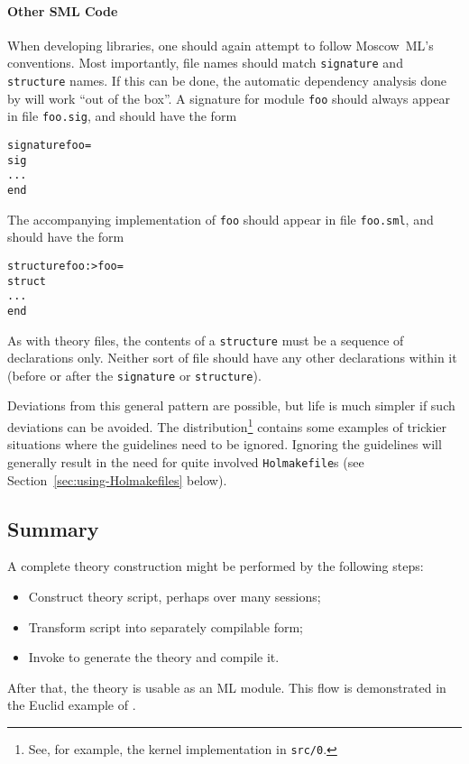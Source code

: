 \paragraph{Other SML Code}
When developing \HOL{} libraries, one should again attempt to follow Moscow~ML's conventions.
Most importantly, file names should match \texttt{signature} and \texttt{structure} names.
If this can be done, the automatic dependency analysis done by \holmake{} will work ``out of the box''.
A signature for module \texttt{foo} should always appear in file \texttt{foo.sig}, and should have the form
\begin{alltt}
    signature foo =
    sig
      ...
    end
\end{alltt}
The accompanying implementation of \texttt{foo} should appear in file \texttt{foo.sml}, and should have the form
\begin{alltt}
    structure foo :> foo =
    struct
    ...
    end
\end{alltt}
As with theory files, the contents of a \texttt{structure} must be a sequence of declarations only.
Neither sort of file should have any other declarations within it (before or after the \texttt{signature} or \texttt{structure}).

Deviations from this general pattern are possible, but life is much simpler if such deviations can be avoided.
The \HOL{} distribution\footnote{See, for example, the kernel implementation in \texttt{src/0}.} contains some examples of trickier situations where the guidelines need to be ignored.
Ignoring the guidelines will generally result in the need for quite involved \texttt{Holmakefile}s (see Section~\ref{sec:using-Holmakefiles} below).

\subsection{Summary}

A complete theory construction might be performed by the following steps:
\begin{itemize}
\item Construct theory script, perhaps over many sessions;
\item Transform script into separately compilable form;
\item Invoke \holmake{} to generate the theory and compile it.
\end{itemize}
After that, the theory is usable as an ML module.
This flow is demonstrated in the Euclid example of \TUTORIAL.

